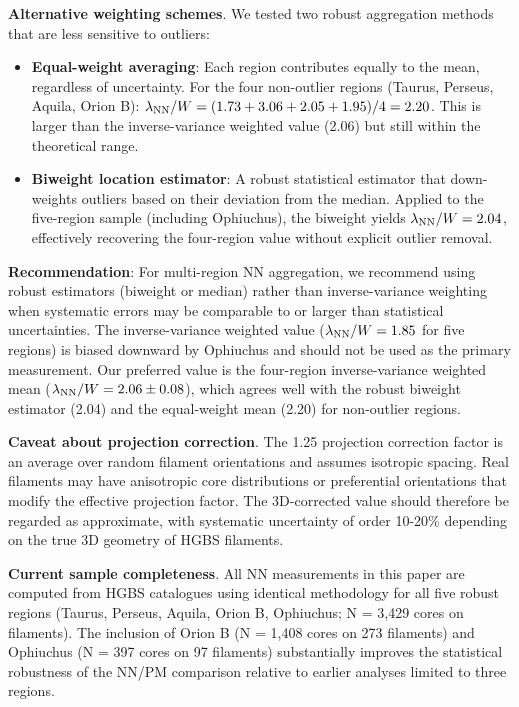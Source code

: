 \documentclass[twoside,twocolumn]{mnras}
\begin{document}
\textbf{Alternative weighting schemes}. We tested two robust aggregation methods that are less sensitive to outliers:

\begin{itemize}
    \item \textbf{Equal-weight averaging}: Each region contributes equally to the mean, regardless of uncertainty. For the four non-outlier regions (Taurus, Perseus, Aquila, Orion B): $\lambda_{\rm NN}/W = (1.73 + 3.06 + 2.05 + 1.95)/4 = 2.20$. This is larger than the inverse-variance weighted value (2.06) but still within the theoretical range.

    \item \textbf{Biweight location estimator}: A robust statistical estimator that down-weights outliers based on their deviation from the median. Applied to the five-region sample (including Ophiuchus), the biweight yields $\lambda_{\rm NN}/W = 2.04$, effectively recovering the four-region value without explicit outlier removal.
\end{itemize}

\textbf{Recommendation}: For multi-region NN aggregation, we recommend using robust estimators (biweight or median) rather than inverse-variance weighting when systematic errors may be comparable to or larger than statistical uncertainties. The inverse-variance weighted value ($\lambda_{\rm NN}/W = 1.85$ for five regions) is biased downward by Ophiuchus and should not be used as the primary measurement. Our preferred value is the four-region inverse-variance weighted mean ($\lambda_{\rm NN}/W = 2.06 \pm 0.08$), which agrees well with the robust biweight estimator (2.04) and the equal-weight mean (2.20) for non-outlier regions.

\textbf{Caveat about projection correction}. The 1.25 projection correction factor is an average over random filament orientations and assumes isotropic spacing. Real filaments may have anisotropic core distributions or preferential orientations that modify the effective projection factor. The 3D-corrected value should therefore be regarded as approximate, with systematic uncertainty of order 10-20\% depending on the true 3D geometry of HGBS filaments.

\textbf{Current sample completeness}. All NN measurements in this paper are computed from HGBS catalogues using identical methodology for all five robust regions (Taurus, Perseus, Aquila, Orion B, Ophiuchus; N = 3,429 cores on filaments). The inclusion of Orion B (N = 1,408 cores on 273 filaments) and Ophiuchus (N = 397 cores on 97 filaments) substantially improves the statistical robustness of the NN/PM comparison relative to earlier analyses limited to three regions.
\end{document}
